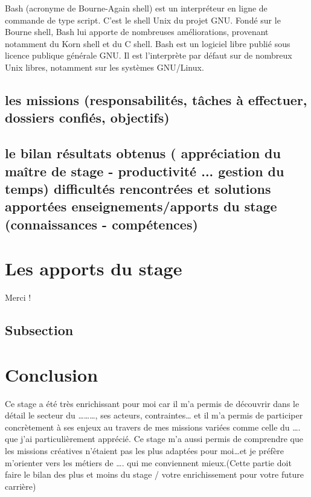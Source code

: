 \documentclass{article}
\begin{document}
Bash (acronyme de Bourne-Again shell) est un interpréteur en ligne de commande de type script. C'est le shell Unix du projet GNU.
\newline
Fondé sur le Bourne shell, Bash lui apporte de nombreuses améliorations, provenant notamment du Korn shell et du C shell. Bash est un logiciel libre publié sous licence publique générale GNU. Il est l'interprète par défaut sur de nombreux Unix libres, notamment sur les systèmes GNU/Linux.

\subsection{les missions (responsabilités, tâches à effectuer, dossiers confiés, objectifs)}

\subsection{le bilan
résultats obtenus ( appréciation du maître de stage - productivité ... gestion du temps)
difficultés rencontrées et solutions apportées
enseignements/apports du stage (connaissances - compétences)}

\newpage

\section{Les apports du stage}
Merci !

\subsection{Subsection}

\newpage

\section{Conclusion}

Ce stage a été très enrichissant pour moi car il m’a permis de découvrir dans le détail le secteur du ………, ses acteurs, contraintes… et il m’a permis de participer concrètement à ses enjeux au travers de mes missions variées comme celle du …. que j’ai particulièrement apprécié. Ce stage m’a aussi permis de comprendre que les missions créatives n’étaient pas les plus adaptées pour moi…et je préfère m’orienter vers les métiers de …. qui me conviennent mieux.(Cette partie doit faire le bilan des plus et moins du stage / votre enrichissement pour votre future carrière)
\end{document}
